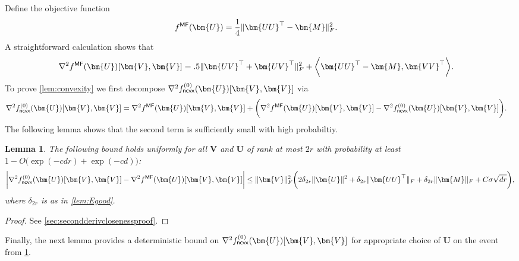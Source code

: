 \documentclass[10pt]{article}
\renewcommand{\t}{^{\top}}
\newtheorem{lemma}{Lemma}
\theoremstyle{definition}
\begin{document}
 Define the objective function
    \begin{align}
        f^{{\sf MF}}(\bm{U}) &= \frac{1}{4} \| \bm{UU}\t - \bm{M} \|_F^2.
    \end{align}
    A straightforward calculation shows that
\begin{align}
    \nabla^2 f^{{\sf MF}}(\bm{U})[\bm{V},\bm{V}] &=  .5 \| \bm{UV}\t + \bm{UV}\t \|_F^2 + \bigg\langle \bm{UU}\t - \bm{M}, \bm{VV}\t \bigg \rangle.
\end{align}
To prove \cref{lem:convexity} we first decompose $\nabla^2 f^{(0)}_{{\sf ncvx}}(\bm{U})[\bm{V}, \bm{V}]$ via
\begin{align}
    \nabla^2 f^{(0)}_{{\sf ncvx}} (\bm{U})[ \bm{V}, \bm{V}] &= \nabla^2 f^{{\sf MF}} (\bm{U})[ \bm{V}, \bm{V}] + \bigg( \nabla^2 f^{{\sf MF}} (\bm{U})[ \bm{V}, \bm{V}] - \nabla^2 f^{(0)}_{{\sf ncvx}} (\bm{U})[ \bm{V}, \bm{V}] \bigg).
\end{align}
The following lemma shows that the second term is sufficiently small with high probabiltiy.
\begin{lemma} \label{lem:secondderivcloseness}
      The following bound holds uniformly for all $\bm{V}$ and $\bm{U}$ of rank at most $2r$ with probability at least $1 - O\big( \exp( - c dr ) + \exp( - c d) \big) $:
    \begin{align}
        \bigg| \nabla^2 f^{(0)}_{{\sf ncvx}}(\bm{U})[ \bm{V}, \bm{V}] - \nabla^2 f^{{\sf MF}}(\bm{U})[ \bm{V}, \bm{V}] \bigg| \leq \| \bm{V}\|_F^2 \bigg( 2 \delta_{2r} \| \bm{U} \|^2 + \delta_{2r} \| \bm{UU}\t \|_F + \delta_{2r} \| \bm{M} \|_F + C \sigma \sqrt{dr} \bigg),
    \end{align}
    where $\delta_{2r}$ is as in \cref{lem:Egood}.  
\end{lemma}
\begin{proof}
    See \cref{sec:secondderivclosenessproof}.
\end{proof}

Finally, the next lemma provides a deterministic bound on $\nabla^2 f^{(0)}_{{\sf ncvx}}(\bm{U})[\bm{V},\bm{V}]$ for appropriate choice of $\bm{U}$ on the event from \cref{lem:secondderivcloseness}.
\end{document}
